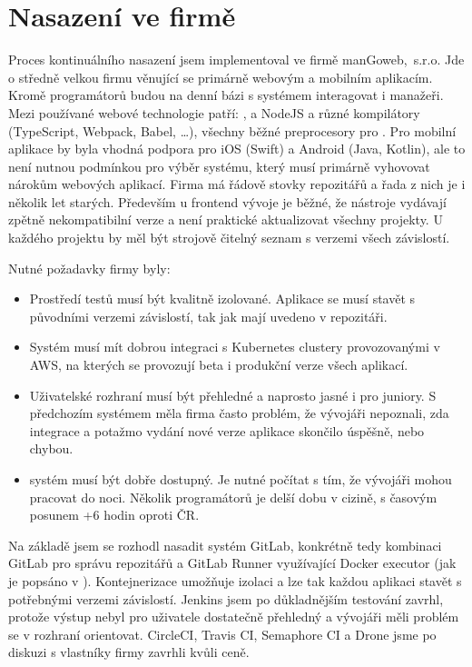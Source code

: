 \chapter{Nasazení ve firmě}
    Proces kontinuálního nasazení jsem implementoval ve firmě manGoweb,~s.r.o. Jde o středně velkou firmu věnující se primárně webovým a mobilním aplikacím. Kromě programátorů budou na denní bázi s \CI systémem interagovat i manažeři. Mezi používané webové technologie patří: ,  a NodeJS a různé kompilátory (TypeScript, Webpack, Babel, …), všechny běžné preprocesory pro . Pro mobilní aplikace by byla vhodná podpora pro iOS (Swift) a Android (Java, Kotlin), ale to není nutnou podmínkou pro výběr \CICD systému, který musí primárně vyhovovat nárokům webových aplikací. Firma má řádově stovky repozitářů a řada z nich je i několik let starých. Především u frontend vývoje je běžné, že nástroje vydávají zpětně nekompatibilní verze a není praktické aktualizovat všechny projekty. U každého projektu by měl být strojově čitelný seznam s verzemi všech závislostí.

    Nutné požadavky firmy byly:
    \begin{itemize}
        \item Prostředí testů musí být kvalitně izolované. Aplikace se musí stavět s původními verzemi závislostí, tak jak mají uvedeno v repozitáři.
        \item Systém musí mít dobrou integraci s Kubernetes clustery provozovanými v AWS, na kterých se provozují beta i produkční verze všech aplikací.
        \item Uživatelské rozhraní musí být přehledné a naprosto jasné i pro juniory. S předchozím systémem měla firma často problém, že vývojáři nepoznali, zda integrace a potažmo vydání nové verze aplikace skončilo úspěšně, nebo chybou.
        \item \CICD systém musí být dobře dostupný. Je nutné počítat s tím, že vývojáři mohou pracovat do noci. Několik programátorů je delší dobu v cizině, s časovým posunem +6 hodin oproti ČR\@.
    \end{itemize}

    Na základě  jsem se rozhodl nasadit \CICD systém GitLab, konkrétně tedy kombinaci GitLab pro správu repozitářů a GitLab Runner využívající Docker executor (jak je popsáno v ). Kontejnerizace umožňuje izolaci a lze tak každou aplikaci stavět s potřebnými verzemi závislostí. Jenkins jsem po důkladnějším testování zavrhl, protože výstup nebyl pro uživatele dostatečně přehledný a vývojáři měli problém se v rozhraní orientovat. CircleCI, Travis CI, Semaphore CI a Drone jsme po diskuzi s vlastníky firmy zavrhli kvůli ceně.

